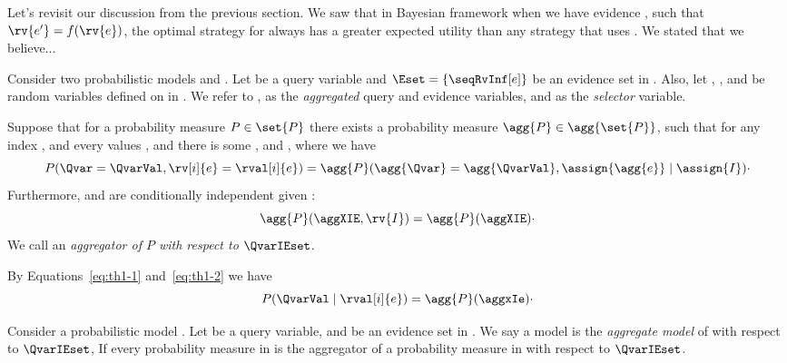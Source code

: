 Let’s revisit our discussion from the previous section.
We saw that in Bayesian framework when we have evidence , such that $\rv{e'} = f(\rv{e})$, the
optimal strategy for  always has a greater expected utility than any strategy that uses .
We stated that we believe...


\begin{definition}[Aggregator]
    Consider two probabilistic models \model and \aggmodel.
    Let \Qvar be a query variable and $\Eset = \{\seqRvInf[e]\}$ be an evidence set in \M.
    Also, let , \agg{\Qvar}, and  be random variables defined on  in \Magg.
    We refer to ,  as the \emph{aggregated} query and evidence variables, and  as the
    \emph{selector} variable.

    Suppose that for a probability measure $P \in \set{P}$ there exists a probability measure
    $\agg{P} \in \agg{\set{P}}$, such that for any index , and every values \QvarVal, and 
    there is some \agg{\QvarVal}, and , where we have
    \begin{equation}
        P(\Qvar = \QvarVal, \rv[i]{e} = \rval[i]{e}) =
        \agg{P}(\agg{\Qvar} = \agg{\QvarVal}, \assign{\agg{e}} \mid \assign{I}) \cdot
        \label{eq:th1-1}
    \end{equation}
    Furthermore, \agg{\Qvar} and  are conditionally independent given :
    \begin{equation}
        \agg{P}(\aggXIE, \rv{I}) = \agg{P}(\aggXIE) \cdot
        \label{eq:th1-2}
    \end{equation}
    We call  an \emph{aggregator of $P$ with respect to $\QvarIEset$}.
\end{definition}

\begin{proposition}
    By Equations~\ref{eq:th1-1} and~\ref{eq:th1-2} we have
    \begin{equation*}
        P(\QvarVal \mid \rval[i]{e}) = \agg{P}(\aggxIe) \cdot
    \end{equation*}
\end{proposition}

\begin{definition}
    \label{def:aggregate-model}
    Consider a probabilistic model \model.
    Let \Qvar be a query variable, and \Eset be an evidence set in \M.
    We say a model \aggmodel is the \emph{aggregate model} of \M with respect to $\QvarIEset$,
    If every probability measure in \Magg is the aggregator of a probability measure in \M with respect to $\QvarIEset$.
\end{definition}

